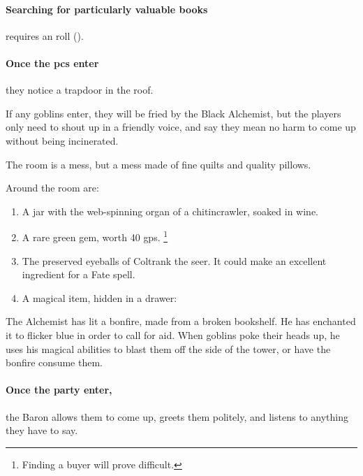 \begin{multicols}{2}
\paragraph{Searching for particularly valuable books}
requires an  roll (\tn[12]).

\paragraph{Once the \glspl{pc} enter}
they notice a trapdoor in the roof.

If any goblins enter, they will be fried by the Black Alchemist, but the players only need to shout up in a friendly voice, and say they mean no harm to come up without being incinerated.


The room is a mess, but a mess made of fine quilts and quality pillows.

Around the room are:

\begin{enumerate}

  \item{A jar with the web-spinning organ of a chitincrawler, soaked in wine.}
  \item{A rare green gem, worth 40 \glspl{gp}.%
  \footnote{Finding a buyer will prove difficult.}}
  \item{The preserved eyeballs of Coltrank the seer.
  It could make an excellent \gls{ingredient} for a Fate spell.}
  \item
  A magical item, hidden in a drawer:

\end{enumerate}

\lootMagic 


\begin{exampletext}
  The Alchemist has lit a bonfire, made from a broken bookshelf.
  He has enchanted it to flicker blue in order to call for aid.
  When goblins poke their heads up, he uses his magical abilities to blast them off the side of the tower, or have the bonfire consume them.
\end{exampletext}

\paragraph{Once the party enter,}
the Baron allows them to come up, greets them politely, and listens to anything they have to say.


\end{multicols}
